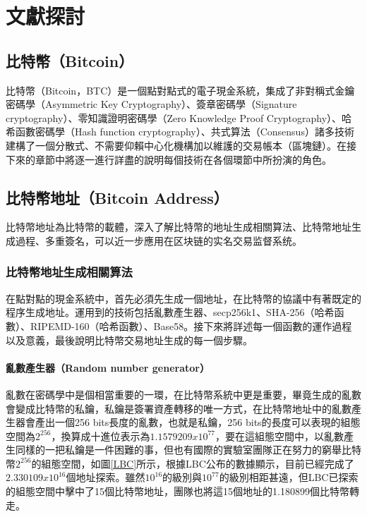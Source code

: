 
\chapter{文獻探討}

	\section{比特幣（Bitcoin）}
	比特幣（Bitcoin，BTC）是一個點對點式的電子現金系統，集成了非對稱式金鑰密碼學（Asymmetric Key Cryptography）\supercite{AsymmetricKeyCryptography}、簽章密碼學（Signature cryptography）、零知識證明密碼學（Zero Knowledge Proof Cryptography）\supercite{Zero-KnowledgeProofsofIdentity}、哈希函數密碼學（Hash function cryptography）、共式算法（Consensus）諸多技術建構了一個分散式、不需要仰賴中心化機構加以維護的交易帳本（區塊鏈）。在接下來的章節中將逐一進行詳盡的說明每個技術在各個環節中所扮演的角色。

	\section{比特幣地址（Bitcoin Address）}
	⽐特幣地址為⽐特幣的載體，深⼊了解⽐特幣的地址⽣成相關算法、⽐特幣地址⽣成過程、多重簽名，可以近⼀步應⽤在区块链的实名交易监督系统。

		\subsection{比特幣地址生成相關算法}
		在點對點的現金系統中，首先必須先生成一個地址，在比特幣的協議中有著既定的程序生成地址。運用到的技術包括亂數產生器、secp256k1\supercite{johnson2001elliptic}、SHA-256（哈希函數）\supercite{DBLP:conf/fse/KhovratovichRS12}、RIPEMD-160（哈希函數）\supercite{DBLP:conf/isw/MendelPRR06}、Base58\supercite{Base58}。接下來將詳述每一個函數的運作過程以及意義，最後說明比特幣交易地址生成的每一個步驟。
		
			\subsubsection{亂數產生器（Random number generator）}
			亂數在密碼學中是個相當重要的一環，在比特幣系統中更是重要，畢竟生成的亂數會變成比特幣的私鑰，私鑰是簽署資產轉移的唯一方式，在比特幣地址中的亂數產生器會產出一個256 bits長度的亂數，也就是私鑰，256 bits的長度可以表現的組態空間為$2^{256}$，換算成十進位表示為$1.1579209x10^{77}$，要在這組態空間中，以亂數產生同樣的一把私鑰是一件困難的事，但也有國際的實驗室\supercite{TheLargeBitcoinCollider}團隊正在努力的窮舉比特幣$2^{256}$的組態空間，如圖\ref{LBC}所示，根據LBC公布的數據顯示，目前已經完成了$2.330109x10^{16}$個地址探索。雖然$10^{16}$的級別與$10^{77}$的級別相距甚遠，但LBC已探索的組態空間中擊中了15個比特幣地址，團隊也將這15個地址的1.180899個比特幣轉走。


